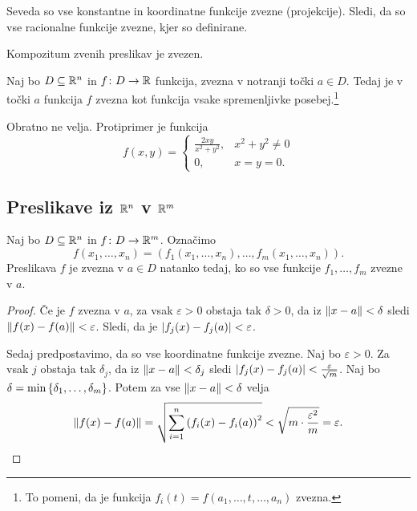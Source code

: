 \obvs

\begin{opomba}
Seveda so vse konstantne in koordinatne funkcije zvezne
(projekcije). Sledi, da so vse racionalne funkcije zvezne, kjer so
definirane.
\end{opomba}

\begin{opomba}
Kompozitum zvenih preslikav je zvezen.
\end{opomba}

\begin{izrek}
Naj bo $D \subseteq \mathbb{R}^n$ in $f \colon D \to \mathbb{R}$ funkcija, zvezna v
notranji točki $a \in D$. Tedaj je v točki $a$ funkcija $f$ zvezna
kot funkcija vsake spremenljivke posebej.\footnote{To pomeni, da je
funkcija $f_i(t) = f(a_1, \dots, t, \dots, a_n)$ zvezna.}
\end{izrek}

\obvs

\begin{opomba}
Obratno ne velja. Protiprimer je funkcija
\[
f(x,y)=\begin{cases}
\frac{2xy}{x^2+y^2},& x^2+y^2\ne 0 \\
0,& x=y=0.
\end{cases}
\]
\end{opomba}

\newpage

\subsection{Preslikave iz $\mathbb{R}^n$ v $\mathbb{R}^m$}

\begin{trditev}
Naj bo $D \subseteq \mathbb{R}^n$ in $f \colon D \to \mathbb{R}^m$. Označimo
\[
f(x_1, \dots, x_n) =
\left(f_1(x_1, \dots, x_n), \dots, f_m(x_1, \dots, x_n)\right).
\]
Preslikava $f$ je zvezna v $a \in D$ natanko tedaj, ko so vse
funkcije $f_1, \dots, f_m$ zvezne v $a$.
\end{trditev}

\begin{proof}
Če je $f$ zvezna v $a$, za vsak $\varepsilon > 0$ obstaja tak
$\delta > 0$, da iz $\left\lVert x - a\right\rVert < \delta$ sledi
$\left\lVert f(x) - f(a)\right\rVert < \varepsilon$. Sledi, da je
$\left\lvert f_j(x) - f_j(a)\right\rvert < \varepsilon$.

Sedaj predpostavimo, da so vse koordinatne funkcije zvezne. Naj bo
$\varepsilon > 0$. Za vsak $j$ obstaja tak $\delta_j$, da iz
$\left\lVert x - a\right\rVert < \delta_j$ sledi
$\left\lvert f_j(x) - f_j(a)\right\rvert < \frac{\varepsilon}{\sqrt{m}}$. Naj bo
$\delta = \min\left\{\delta_1, \dots, \delta_m\right\}$. Potem za vse
$\left\lVert x - a\right\rVert < \delta$ velja
\[
\left\lVert f(x) - f(a)\right\rVert =
\sqrt{\sum_{i=1}^n \left(f_i(x) - f_i(a)\right)^2} <
\sqrt{m \cdot \frac{\varepsilon^2}{m}} = \varepsilon. \qedhere
\]
\end{proof}

